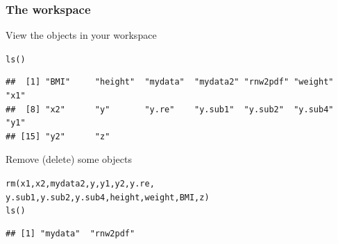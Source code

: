 \documentclass[color=usenames,dvipsnames]{beamer}\usepackage[]{graphicx}\usepackage[]{color}
\makeatletter
\newcommand{\hlstd}[1]{\textcolor[rgb]{0,0,0}{#1}}%
\newcommand{\hlkwd}[1]{\textcolor[rgb]{0.004,0.004,0.506}{#1}}%
\newenvironment{kframe}{%
 \def\at@end@of@kframe{}%
 \ifinner\ifhmode%
  \def\at@end@of@kframe{\end{minipage}}%
  \begin{minipage}{\columnwidth}%
 \fi\fi%
 \def\FrameCommand##1{\hskip\@totalleftmargin \hskip-\fboxsep
 \colorbox{shadecolor}{##1}\hskip-\fboxsep
     \hskip-\linewidth \hskip-\@totalleftmargin \hskip\columnwidth}%
 \MakeFramed {\advance\hsize-\width
   \@totalleftmargin\z@ \linewidth\hsize
   \@setminipage}}%
 {\par\unskip\endMakeFramed%
 \at@end@of@kframe}
\newenvironment{knitrout}{}{} %
\makeatother
\begin{document}
\begin{frame}[fragile]
  \frametitle{The workspace}
  View the objects in your workspace
\begin{knitrout}\scriptsize
{}\color{fgcolor}\begin{kframe}
\begin{alltt}
\hlkwd{ls}\hlstd{()}
\end{alltt}
\begin{verbatim}
##  [1] "BMI"     "height"  "mydata"  "mydata2" "rnw2pdf" "weight"  "x1"     
##  [8] "x2"      "y"       "y.re"    "y.sub1"  "y.sub2"  "y.sub4"  "y1"     
## [15] "y2"      "z"
\end{verbatim}
\end{kframe}
\end{knitrout}
\pause \vfill
Remove (delete) some objects
\begin{knitrout}\scriptsize
{}\color{fgcolor}\begin{kframe}
\begin{alltt}
\hlkwd{rm}\hlstd{(x1, x2, mydata2, y, y1, y2, y.re,}
   \hlstd{y.sub1, y.sub2, y.sub4, height, weight, BMI, z)}
\hlkwd{ls}\hlstd{()}
\end{alltt}
\begin{verbatim}
## [1] "mydata"  "rnw2pdf"
\end{verbatim}
\end{kframe}
\end{knitrout}
\end{frame}
\end{document}
